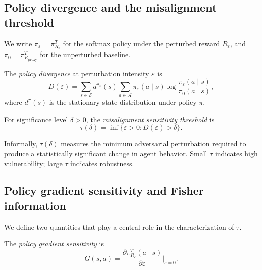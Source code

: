 \subsection{Policy divergence and the misalignment threshold}

We write $\pi_\varepsilon = \pi_{R_\varepsilon}^T$ for the softmax policy
under the perturbed reward $R_\varepsilon$, and $\pi_0 = \pi_{R_{\mathrm{proxy}}}^T$
for the unperturbed baseline.

\begin{definition}\label{def:policy-divergence}
The \emph{policy divergence} at perturbation intensity $\varepsilon$ is
\begin{equation}\label{eq:policy-divergence}
D(\varepsilon) = \sum_{s \in \mathcal{S}} d^{\pi_\varepsilon}(s) \sum_{a \in
  \mathcal{A}} \pi_\varepsilon(a \mid s) \log \frac{\pi_\varepsilon(a \mid
  s)}{\pi_0(a \mid s)},
\end{equation}
where $d^{\pi}(s)$ is the stationary state distribution under policy $\pi$.
\end{definition}

\begin{definition}\label{def:threshold}
For significance level $\delta > 0$, the \emph{misalignment sensitivity
threshold} is
\begin{equation}\label{eq:threshold}
\tau(\delta) = \inf\bigl\{\varepsilon > 0 : D(\varepsilon) > \delta \bigr\}.
\end{equation}
\end{definition}

Informally, $\tau(\delta)$ measures the minimum adversarial perturbation
required to produce a statistically significant change in agent behavior.
Small $\tau$ indicates high vulnerability; large $\tau$ indicates robustness.

\subsection{Policy gradient sensitivity and Fisher information}

We define two quantities that play a central role in the characterization of
$\tau$.

\begin{definition}\label{def:gradient-sensitivity}
The \emph{policy gradient sensitivity} is
\begin{equation}\label{eq:gradient}
G(s,a) = \frac{\partial \pi_{R_\varepsilon}^T(a \mid s)}{\partial
  \varepsilon}\bigg|_{\varepsilon = 0}.
\end{equation}
\end{definition}

